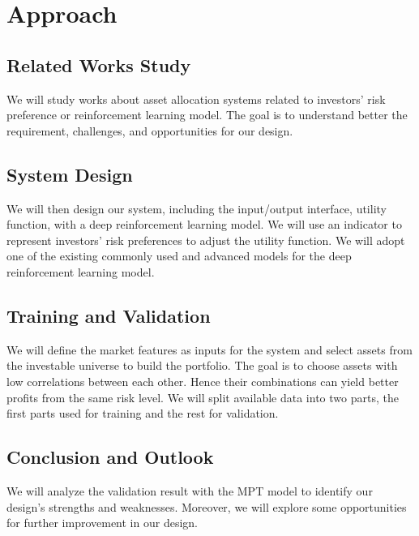 \chapter{Approach}
\section{Related Works Study}
We will study works about asset allocation systems related to investors' risk preference or reinforcement learning model. The goal is to understand better the requirement, challenges, and opportunities for our design.
\section{System Design}
We will then design our system, including the input/output interface, utility function, with a deep reinforcement learning model. We will use an indicator to represent investors' risk preferences to adjust the utility function. We will adopt one of the existing commonly used and advanced models for the deep reinforcement learning model.
\section{Training and Validation}
We will define the market features as inputs for the system and select assets from the investable universe to build the portfolio. The goal is to choose assets with low correlations between each other. Hence their combinations can yield better profits from the same risk level.
We will split available data into two parts, the first parts used for training and the rest for validation.
\section{Conclusion and Outlook}
We will analyze the validation result with the MPT model to identify our design's strengths and weaknesses. Moreover, we will explore some opportunities for further improvement in our design.

